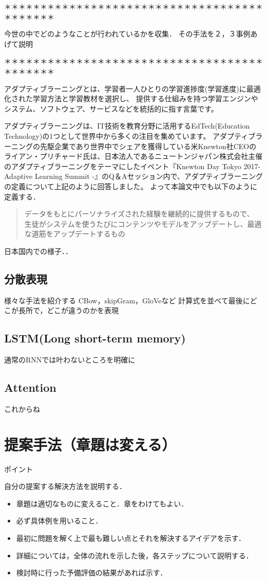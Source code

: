 \documentclass[a4j,11pt,report]{jsbook}
\newcommand{\point}[1]{
\begin{itembox}[l]{ポイント}
  #1
\end{itembox}
}
\begin{document}
＊＊＊＊＊＊＊＊＊＊＊＊＊＊＊＊＊＊＊＊＊＊＊＊＊＊＊＊＊＊＊＊＊＊＊＊＊＊＊＊＊＊＊

今世の中でどのようなことが行われているかを収集．
その手法を２，３事例あげて説明

＊＊＊＊＊＊＊＊＊＊＊＊＊＊＊＊＊＊＊＊＊＊＊＊＊＊＊＊＊＊＊＊＊＊＊＊＊＊＊＊＊＊＊

アダプティブラーニングとは、学習者一人ひとりの学習進捗度(学習進度)に最適化された学習方法と学習教材を選択し、
提供する仕組みを持つ学習エンジンやシステム、ソフトウェア、サービスなどを統括的に指す言葉です。

アダプティブラーニングは、IT技術を教育分野に活用するEdTech(Education Technology)の1つとして世界中から多くの注目を集めています。
アダプティブラーニングの先駆企業であり世界中でシェアを獲得している米Knewton社CEOのライアン・プリチャード氏は、日本法人であるニュートンジャパン株式会社主催のアダプティブラーニングをテーマにしたイベント『Knewton Day Tokyo 2017- Adaptive Learning Summit -』のQ＆Aセッション内で、アダプティブラーニングの定義について上記のように回答しました。
よって本論文中でも以下のように定義する．
\begin{quote}
  データをもとにパーソナライズされた経験を継続的に提供するもので、
  生徒がシステムを使うたびにコンテンツやモデルをアップデートし、最適な道筋をアップデートするもの
\end{quote}

日本国内での様子．．


\section{分散表現}
様々な手法を紹介する
CBow，skipGram，GloVeなど
計算式を並べて最後にどこが長所で，どこが違うのかを表現


\section{LSTM(Long short-term memory)}

通常のRNNでは叶わないところを明確に

\section{Attention}

これからね



\chapter{提案手法（章題は変える）\label{ch:method}}
\point{
自分の提案する解決方法を説明する．
\begin{itemize}
  \item 章題は適切なものに変えること．章をわけてもよい．
  \item 必ず具体例を用いること．
  \item 最初に問題を解く上で最も難しい点とそれを解決するアイデアを示す．
  \item 詳細については，全体の流れを示した後，各ステップについて説明する．
  \item 検討時に行った予備評価の結果があれば示す．
\end{itemize}
}
\end{document}
